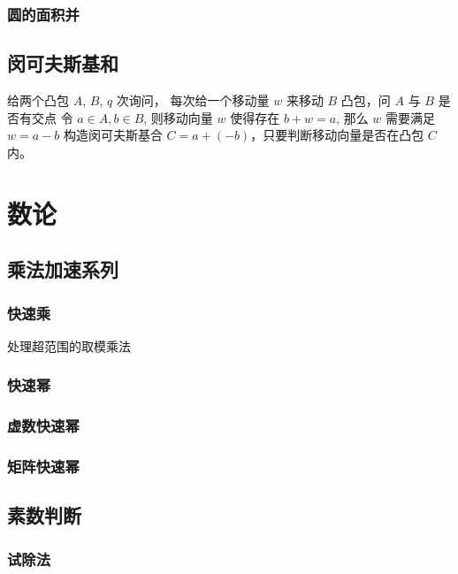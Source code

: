 \documentclass{probook}
\begin{document}
\subsection{圆的面积并} 

\section{闵可夫斯基和}
给两个凸包 $A$, $B$, $q$ 次询问， 每次给一个移动量 $w$ 来移动 $B$ 凸包，问 $A$ 与 $B$ 是否有交点
令 $a\in A, b \in B$, 则移动向量 $w$ 使得存在 $b + w = a$, 那么 $w$ 需要满足 $w = a - b$
构造闵可夫斯基合 $C = {a + (-b)}$，只要判断移动向量是否在凸包 $C$ 内。




\chapter{数论} 
\section{乘法加速系列}
\subsection{快速乘}
处理超范围的取模乘法

\subsection{快速幂}

\subsection{虚数快速幂}

\subsection{矩阵快速幂}

\section{素数判断}
\subsection{试除法}

\end{document}
